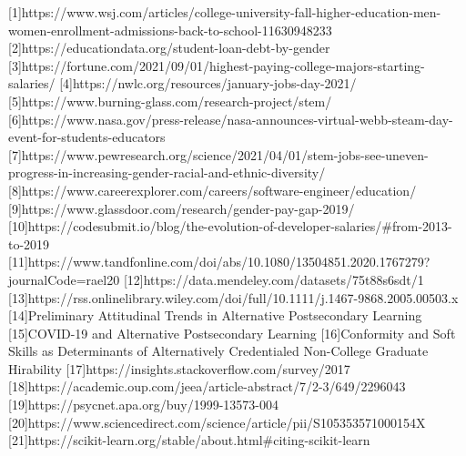\documentclass[review]{elsarticle}
\begin{document}


[1]https://www.wsj.com/articles/college-university-fall-higher-education-men-women-enrollment-admissions-back-to-school-11630948233
[2]https://educationdata.org/student-loan-debt-by-gender
[3]https://fortune.com/2021/09/01/highest-paying-college-majors-starting-salaries/
[4]https://nwlc.org/resources/january-jobs-day-2021/
[5]https://www.burning-glass.com/research-project/stem/
[6]https://www.nasa.gov/press-release/nasa-announces-virtual-webb-steam-day-event-for-students-educators
[7]https://www.pewresearch.org/science/2021/04/01/stem-jobs-see-uneven-progress-in-increasing-gender-racial-and-ethnic-diversity/
[8]https://www.careerexplorer.com/careers/software-engineer/education/
[9]https://www.glassdoor.com/research/gender-pay-gap-2019/
[10]https://codesubmit.io/blog/the-evolution-of-developer-salaries/#from-2013-to-2019
[11]https://www.tandfonline.com/doi/abs/10.1080/13504851.2020.1767279?journalCode=rael20
[12]https://data.mendeley.com/datasets/75t88s6sdt/1
[13]https://rss.onlinelibrary.wiley.com/doi/full/10.1111/j.1467-9868.2005.00503.x
[14]Preliminary Attitudinal Trends in Alternative Postsecondary Learning
[15]COVID-19 and Alternative Postsecondary Learning
[16]Conformity and Soft Skills as Determinants of Alternatively Credentialed Non-College Graduate Hirability
[17]https://insights.stackoverflow.com/survey/2017
[18]https://academic.oup.com/jeea/article-abstract/7/2-3/649/2296043
[19]https://psycnet.apa.org/buy/1999-13573-004
[20]https://www.sciencedirect.com/science/article/pii/S105353571000154X
[21]https://scikit-learn.org/stable/about.html#citing-scikit-learn
\end{document}
